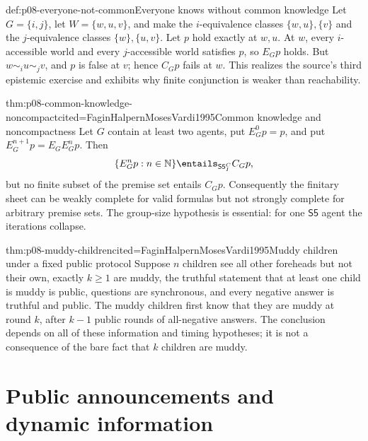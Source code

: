 \begin{hbexample}{def:p08-everyone-not-common}{Everyone knows without common knowledge}
Let \(G=\{i,j\}\), let \(W=\{w,u,v\}\), and make the \(i\)-equivalence
classes \(\{w,u\},\{v\}\) and the \(j\)-equivalence classes
\(\{w\},\{u,v\}\).  Let \(p\) hold exactly at \(w,u\).  At \(w\), every
\(i\)-accessible world and every \(j\)-accessible world satisfies \(p\), so
\(E_Gp\) holds.  But \(w\sim_i u\sim_j v\), and \(p\) is false at \(v\);
hence \(C_Gp\) fails at \(w\).  This realizes the source's third epistemic
exercise and exhibits why finite conjunction is weaker than reachability.
\end{hbexample}

\begin{hbtheorem}{thm:p08-common-knowledge-noncompact}{cited=FaginHalpernMosesVardi1995}{Common knowledge and noncompactness}
Let \(G\) contain at least two agents, put \(E_G^0p=p\), and put
\(E_G^{n+1}p=E_GE_G^np\).  Then
\[
 \{E_G^np:n\in\mathbb N\}\entails_{\mathsf{S5}_{I}^{C}} C_Gp,
\]
but no finite subset of the premise set entails \(C_Gp\).  Consequently the
finitary sheet can be weakly complete for valid formulas but not strongly
complete for arbitrary premise sets.  The group-size hypothesis is essential:
for one \(\mathsf{S5}\) agent the iterations collapse.
\end{hbtheorem}

\begin{hbtheorem}{thm:p08-muddy-children}{cited=FaginHalpernMosesVardi1995}{Muddy children under a fixed public protocol}
Suppose \(n\) children see all other foreheads but not their own, exactly
\(k\ge1\) are muddy, the truthful statement that at least one child is muddy is
public, questions are synchronous, and every negative answer is truthful and
public.  The muddy children first know that they are muddy at round \(k\),
after \(k-1\) public rounds of all-negative answers.  The conclusion depends on
all of these information and timing hypotheses; it is not a consequence of the
bare fact that \(k\) children are muddy.
\end{hbtheorem}

\section[Public announcements]{Public announcements and dynamic information}

